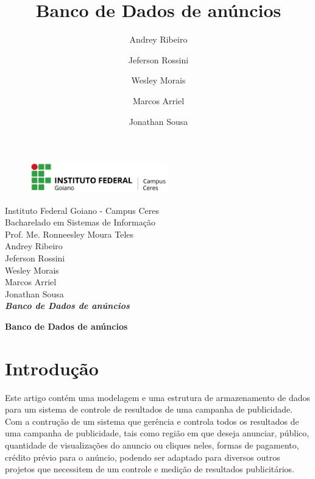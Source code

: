 \documentclass[12pt,a4paper]{article}
\title{Banco de Dados de anúncios}
\author{Andrey Ribeiro \and Jeferson Rossini\and Wesley Morais\and Marcos Arriel\and Jonathan Sousa}
\begin{document}
\begin{titlepage}
\begin{center}
\begin{figure}[htb]
                
                \label{figura:LogoIF}
        
                \centering
                \includegraphics[width=6cm]{recursos/imagens/logo.png} 
\end{figure}
Instituto Federal Goiano - Campus Ceres\\
Bacharelado em Sistemas de Informação\\
Prof. Me. Ronneesley Moura Teles\\\vspace{0.5cm}
Andrey Ribeiro \\
Jeferson Rossini\\
Wesley Morais\\
Marcos Arriel\\
Jonathan Sousa\\
\vspace{5.0cm}
\textit{\textbf{\Large{Banco de Dados de anúncios}}}\\\vspace{0.5cm}
\vspace{9.5cm}
\end{center}
\end{titlepage}
\tableofcontents
\newpage
\begin{center}
\textbf{\Large{Banco de Dados de anúncios }}\\\vspace{0.5cm}
\end{center}
\section{Introdução}
Este artigo contém uma modelagem e uma estrutura de armazenamento de dados para um sistema de controle de resultados de uma campanha de publicidade. Com a contrução de um sistema que gerência e controla todos os resultados de uma campanha de publicidade, tais como região em que deseja anunciar, público, quantidade de visualizações do anuncio ou cliques neles, formas de pagamento, crédito prévio para o anúncio, podendo ser adaptado para diversos outros projetos que necessitem de um controle e medição de resultados publicitários.
\end{document}
